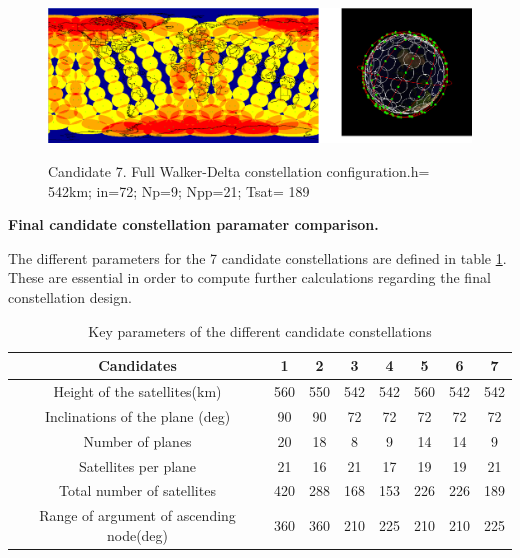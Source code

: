 \begin{figure}%
	\centering
	\includegraphics[width=1\textwidth]{Candidate7.png}\\
	\caption{Candidate 7. Full Walker-Delta constellation configuration.h= 542km; in=72; Np=9; Npp=21; Tsat= 189}
	\label{fig:Candidate7}
\end{figure}

\textbf{Final candidate constellation paramater comparison.}


The different parameters for the 7 candidate constellations are defined in table \ref{candidateparameters}. These are essential in order to compute further calculations regarding the final constellation design. 


\begin{table}[h]
\centering
\begin{tabular}{ | c | c | c | c | c | c | c | c | }
\hline
	
	\textbf{Candidates} & \textbf{1} & \textbf{2} & \textbf{3} & \textbf{4} & \textbf{5} & \textbf{6} & \textbf{7} \\ \hline
	Height of the satellites(km) & 560 & 550 & 542 & 542 & 560 & 542 & 542 \\ \hline
	Inclinations of the plane (deg) & 90 & 90 & 72 & 72 & 72 & 72 & 72 \\ \hline
	Number of planes & 20 & 18 & 8 & 9 & 14 & 14 & 9 \\ \hline
	Satellites per plane & 21 & 16 & 21 & 17 & 19 & 19 & 21 \\ \hline
	Total number of satellites & 420 & 288 & 168 & 153 & 226 & 226 & 189\\ \hline
	Range of argument of ascending node(deg)& 360 & 360 & 210 & 225 & 210 & 210 & 225 \\ \hline
	
\end{tabular}
\caption{Key parameters of the different candidate constellations}\label{candidateparameters}
\end{table}
